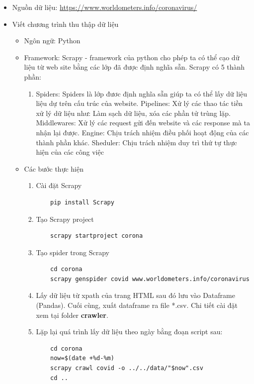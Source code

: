 \documentclass[a4paper, 12pt]{article}
\begin{document}
    \begin{itemize}
        \item Nguồn dữ liệu: \url{https://www.worldometers.info/coronavirus/}
        \item Viết chương trình thu thập dữ liệu
        \begin{itemize}
            \item Ngôn ngữ: Python
            \item Framework: Scrapy - framework của python cho phép ta có thể cạo dữ liệu từ web site bằng các lớp đã được định nghĩa sẵn. Scrapy có 5 thành phần:
            \begin{enumerate}
                \item Spiders: Spiders là lớp đươc định nghĩa sẵn giúp ta có thể lấy dữ liệu liệu dự trên cấu trúc của website.
                Pipelines: Xử lý các thao tác tiền xử lý dữ liệu như: Làm sạch dữ liệu, xóa các phần tử trùng lặp.
                Middlewares: Xử lý các request gửi đến website và các response mà ta nhận lại được.
                Engine: Chịu trách nhiệm điều phối hoạt động của các thành phần khác.
                Sheduler: Chịu trách nhiệm duy trì thứ tự thực hiện của các công việc
            \end{enumerate}

            \item Các bước thực hiện
            \begin{enumerate}
                \item Cài đặt Scrapy
                \begin{verbatim}
    pip install Scrapy
                \end{verbatim}

                \item Tạo Scrapy project
                \begin{verbatim}
    scrapy startproject corona
                \end{verbatim}

                \item Tạo spider trong Scrapy
                \begin{verbatim}
    cd corona
    scrapy genspider covid www.worldometers.info/coronavirus
                \end{verbatim}

                \item Lấy dữ liệu từ xpath của trang HTML sau đó lưu vào Dataframe (Pandas). Cuối cùng, xuất dataframe ra file *.csv. Chi tiết cài đặt xem tại folder \textbf{crawler}.
                \item Lặp lại quá trình lấy dữ liệu theo ngày bằng đoạn script sau:
                \begin{verbatim}
    cd corona
    now=$(date +%d-%m)
    scrapy crawl covid -o ../../data/"$now".csv
    cd ..
                \end{verbatim}
            \end{enumerate}
        \end{itemize}
    \end{itemize}
\end{document}
